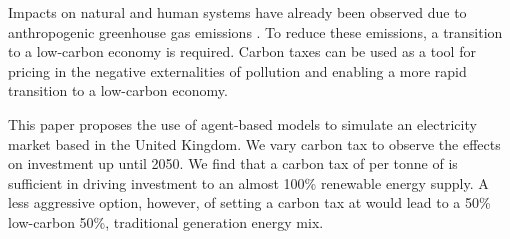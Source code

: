 Impacts on natural and human systems have already been observed due to anthropogenic greenhouse gas emissions \cite{Masson-Delmotte2018}. To reduce these emissions, a transition to a low-carbon economy is required. Carbon taxes can be used as a tool for pricing in the negative externalities of pollution and enabling a more rapid transition to a low-carbon economy.

This paper proposes the use of agent-based models to simulate an electricity market based in the United Kingdom. We vary carbon tax to observe the effects on investment up until 2050. We find that a carbon tax of  per tonne of  is sufficient in driving investment to an almost 100\% renewable energy supply. A less aggressive option, however, of setting a carbon tax at  would lead to a 50\% low-carbon 50\%, traditional generation energy mix.

